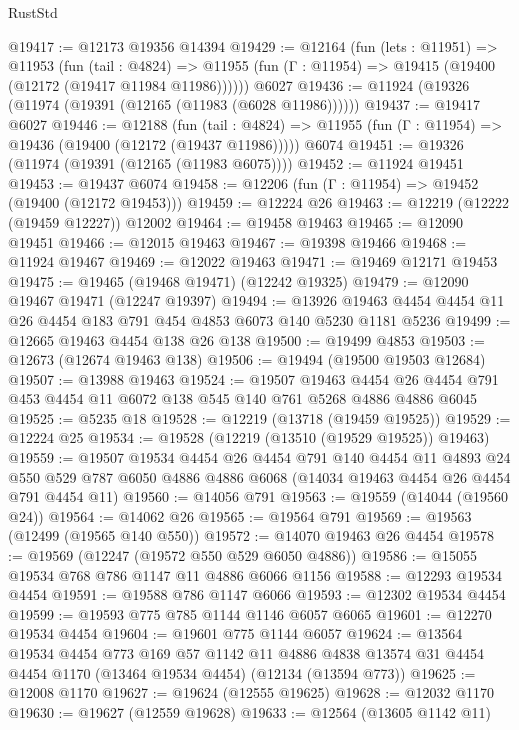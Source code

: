 \begin{lexlean}{RustStd}
\begin{coremodule}
{\begin{coremodule}
{{{{{{{{{{{{{{{{{{{{{{{{{{{{{{{{{{{{{{{{{{{{{{{{{{{{{{{{{{{{{{{{{{{{{{{{{{{{{{{{@19417 := @12173 @19356 @14394
@19429 := @12164
    (fun (lets : @11951) =>
    @11953
      (fun (tail : @4824) =>
      @11955 (fun (Γ : @11954) => @19415 (@19400 (@12172 (@19417 @11984 @11986))))))
    @6027
@19436 := @11924 (@19326 (@11974 (@19391 (@12165 (@11983 (@6028 @11986))))))
@19437 := @19417 @6027
@19446 := @12188
    (fun (tail : @4824) => @11955 (fun (Γ : @11954) => @19436 (@19400 (@12172 (@19437 @11986)))))
    @6074
@19451 := @19326 (@11974 (@19391 (@12165 (@11983 @6075))))
@19452 := @11924 @19451
@19453 := @19437 @6074
@19458 := @12206 (fun (Γ : @11954) => @19452 (@19400 (@12172 @19453)))
@19459 := @12224 @26
@19463 := @12219 (@12222 (@19459 @12227)) @12002
@19464 := @19458 @19463
@19465 := @12090 @19451
@19466 := @12015 @19463
@19467 := @19398 @19466
@19468 := @11924 @19467
@19469 := @12022 @19463
@19471 := @19469 @12171 @19453
@19475 := @19465 (@19468 @19471) (@12242 @19325)
@19479 := @12090 @19467 @19471 (@12247 @19397)
@19494 := @13926 @19463 @4454 @4454 @11 @26 @4454 @183 @791 @454 @4853 @6073 @140 @5230 @1181 @5236
@19499 := @12665 @19463 @4454 @138 @26 @138
@19500 := @19499 @4853
@19503 := @12673 (@12674 @19463 @138)
@19506 := @19494 (@19500 @19503 @12684)
@19507 := @13988 @19463
@19524 := @19507
    @19463
    @4454
    @26
    @4454
    @791
    @453
    @4454
    @11
    @6072
    @138
    @545
    @140
    @761
    @5268
    @4886
    @4886
    @6045
@19525 := @5235 @18
@19528 := @12219 (@13718 (@19459 @19525))
@19529 := @12224 @25
@19534 := @19528 (@12219 (@13510 (@19529 @19525)) @19463)
@19559 := @19507
    @19534
    @4454
    @26
    @4454
    @791
    @140
    @4454
    @11
    @4893
    @24
    @550
    @529
    @787
    @6050
    @4886
    @4886
    @6068
    (@14034 @19463 @4454 @26 @4454 @791 @4454 @11)
@19560 := @14056 @791
@19563 := @19559 (@14044 (@19560 @24))
@19564 := @14062 @26
@19565 := @19564 @791
@19569 := @19563 (@12499 (@19565 @140 @550))
@19572 := @14070 @19463 @26 @4454
@19578 := @19569 (@12247 (@19572 @550 @529 @6050 @4886))
@19586 := @15055 @19534 @768 @786 @1147 @11 @4886 @6066 @1156
@19588 := @12293 @19534 @4454
@19591 := @19588 @786 @1147 @6066
@19593 := @12302 @19534 @4454
@19599 := @19593 @775 @785 @1144 @1146 @6057 @6065
@19601 := @12270 @19534 @4454
@19604 := @19601 @775 @1144 @6057
@19624 := @13564
    @19534
    @4454
    @773
    @169
    @57
    @1142
    @11
    @4886
    @4838
    @13574
    @31
    @4454
    @4454
    @1170
    (@13464 @19534 @4454)
    (@12134 (@13594 @773))
@19625 := @12008 @1170
@19627 := @19624 (@12555 @19625)
@19628 := @12032 @1170
@19630 := @19627 (@12559 @19628)
@19633 := @12564 (@13605 @1142 @11)
}}}}}}}}}}}}}}}}}}}}}}}}}}}}}}}}}}}}}}}}}}}}}}}}}}}}}}}}}}}}}}}}}}}}}}}}}}}}}}}}
\end{coremodule}}
\end{coremodule}
\end{lexlean}
